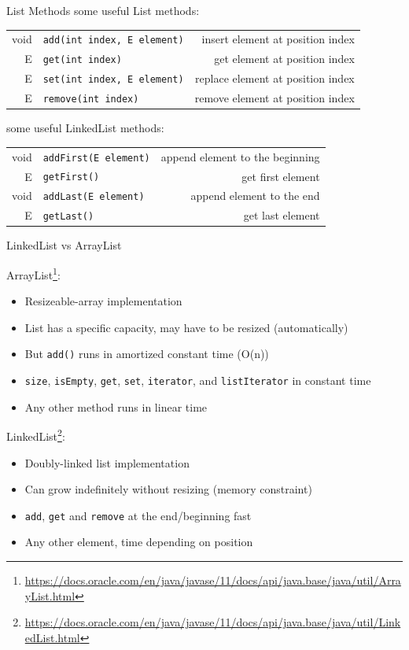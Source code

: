	\begin{frame}[fragile]{List Methods}
		some useful List methods:\\
		\vspace{1em}
		\begin{tabular}{ r l r }
			void & \texttt{add(int index, E element)}
			& \footnotesize{insert element at position index} \\
			E &\texttt{get(int index)}
			& \footnotesize{get element at position index} \\
			E &\texttt{set(int index, E element)}
			& \footnotesize{replace element at position index} \\
			E &\texttt{remove(int index)}
			& \footnotesize{remove element at position index}
		\end{tabular}
		\vfill
		some useful LinkedList methods:\\
		\vspace{1em}
		\begin{tabular}{ r l r }
			void & \texttt{addFirst(E element)}
			& \footnotesize{append element to the beginning} \\
			E & \texttt{getFirst()}
			& \footnotesize{get first element} \\
			void & \texttt{addLast(E element)}
			& \footnotesize{append element to the end} \\
			E & \texttt{getLast()}
			& \footnotesize{get last element}
		\end{tabular}
	\end{frame}
	
	\begin{frame}[allowframebreaks]{LinkedList vs ArrayList}
		
		ArrayList\footnote{ \url{https://docs.oracle.com/en/java/javase/11/docs/api/java.base/java/util/ArrayList.html}}:
		\begin{itemize}
			\item Resizeable-array implementation
			\item List has a specific capacity, may have to be resized (automatically)
			\item But \texttt{add()} runs in amortized constant time (O(n))
			\item \texttt{size}, \texttt{isEmpty}, \texttt{get}, \texttt{set}, \texttt{iterator}, and \texttt{listIterator} in constant time
			\item Any other method runs in linear time
		\end{itemize}
		
		\framebreak
		LinkedList\footnote{\url{https://docs.oracle.com/en/java/javase/11/docs/api/java.base/java/util/LinkedList.html}}:
		\begin{itemize}
			\item Doubly-linked list implementation
			\item Can grow indefinitely without resizing (memory constraint)
			\item \texttt{add}, \texttt{get} and \texttt{remove} at the end/beginning fast
			\item Any other element, time depending on position
		\end{itemize}
		
		
	\end{frame}
	
